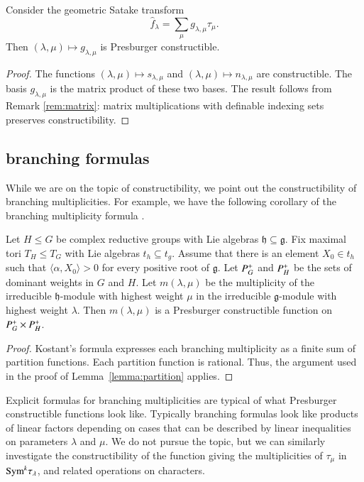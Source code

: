 \begin{corollary} 
  Consider the geometric Satake transform
\[
\hat f_\lambda = \sum_\mu g_{\lambda,\mu} \tau_\mu.
\]
Then $(\lambda,\mu)\mapsto g_{\lambda,\mu}$ is Presburger
constructible.
\end{corollary}

\begin{proof}  
  The functions $(\lambda,\mu)\mapsto s_{\lambda,\mu}$ and
  $(\lambda,\mu)\mapsto n_{\lambda,\mu}$ are constructible.  The basis
  $g_{\lambda,\mu}$ is the matrix product of these two bases.  The
  result follows from Remark \ref{rem:matrix}: matrix multiplications
  with definable indexing sets preserves constructibility.
\end{proof}

\subsection{branching formulas}

While we are on the topic of constructibility, we point out the
constructibility of branching multiplicities.  For example, we have
the following corollary of the branching multiplicity formula
\cite[Theorem ~8.2.1]{goodman}.

\begin{lemma} 
  Let $H\le G$ be complex reductive groups with Lie algebras
  ${\mathfrak h}\subseteq {\mathfrak g}$.  Fix maximal tori $T_H\le
  T_G$ with Lie algebras $t_h\subseteq t_g$.  Assume that there is an
  element $X_0\in t_h$ such that $\langle\alpha,X_0\rangle>0$ for
  every positive root of ${\mathfrak g}$.  Let $P^+_G$ and $P^+_H$
  be the sets of dominant weights in $G$ and $H$.  Let
  $m(\lambda,\mu)$ be the multiplicity of the irreducible $\mathfrak
  h$-module with highest weight $\mu$ in the irreducible $\mathfrak
  g$-module with highest weight $\lambda$.  Then $m(\lambda,\mu)$ is a
  Presburger constructible function on $P^+_G\times P^+_H$.
\end{lemma}

\begin{proof}  
  Kostant's formula expresses each branching multiplicity as a finite
  sum of partition functions.  Each partition function is rational.
  Thus, the argument used in the proof of Lemma~\ref{lemma:partition}
  applies.
\end{proof}

Explicit formulas for branching multiplicities are typical of what
Presburger constructible functions look like.  Typically branching
formulas look like products of linear factors depending on cases that
can be described by linear inequalities on parameters $\lambda$ and
$\mu$.  We do not pursue the topic, but we can similarly investigate
the constructibility of the function giving the multiplicities of
$\tau_\mu$ in ${\operatorname{Sym}}^k \tau_\lambda$, and related operations on
characters.

